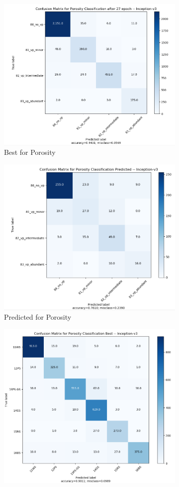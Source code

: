 \begin{figure}
\begin{subfigure}{.5\textwidth}
  \centering
  \includegraphics[width=.8\linewidth]{figures/04-go_baby_best.PNG}
  \caption{Best for Porosity}
  \label{fig:googcm_poro}
\end{subfigure}%
\begin{subfigure}{.5\textwidth}
  \centering
  \includegraphics[width=.8\linewidth]{figures/04-go_baby_pred.PNG}
  \caption{Predicted for Porosity}
  \label{fig:googcmpred_poro}
\end{subfigure}
\begin{subfigure}{.5\textwidth}
  \centering
  \includegraphics[width=.8\linewidth]{figures/04-go_dunham_best.PNG}

\end{subfigure}
\end{figure}
